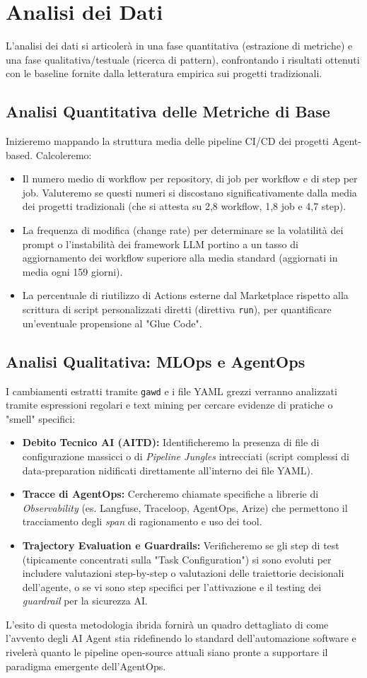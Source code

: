 \documentclass[a4paper,11pt]{article}
\begin{document}
\section{Analisi dei Dati}
L'analisi dei dati si articolerà in una fase quantitativa (estrazione di metriche) e una fase qualitativa/testuale (ricerca di pattern), confrontando i risultati ottenuti con le baseline fornite dalla letteratura empirica sui progetti tradizionali.

\subsection{Analisi Quantitativa delle Metriche di Base}
Inizieremo mappando la struttura media delle pipeline CI/CD dei progetti Agent-based. Calcoleremo:
\begin{itemize}
    \item Il numero medio di workflow per repository, di job per workflow e di step per job. Valuteremo se questi numeri si discostano significativamente dalla media dei progetti tradizionali (che si attesta su 2,8 workflow, 1,8 job e 4,7 step).
    \item La frequenza di modifica (change rate) per determinare se la volatilità dei prompt o l'instabilità dei framework LLM portino a un tasso di aggiornamento dei workflow superiore alla media standard (aggiornati in media ogni 159 giorni).
    \item La percentuale di riutilizzo di Actions esterne dal Marketplace rispetto alla scrittura di script personalizzati diretti (direttiva \texttt{run}), per quantificare un'eventuale propensione al "Glue Code".
\end{itemize}

\subsection{Analisi Qualitativa: MLOps e AgentOps}
I cambiamenti estratti tramite \texttt{gawd} e i file YAML grezzi verranno analizzati tramite espressioni regolari e text mining per cercare evidenze di pratiche o "smell" specifici:
\begin{itemize}
    \item \textbf{Debito Tecnico AI (AITD):} Identificheremo la presenza di file di configurazione massicci o di \textit{Pipeline Jungles} intrecciati (script complessi di data-preparation nidificati direttamente all'interno dei file YAML).
    \item \textbf{Tracce di AgentOps:} Cercheremo chiamate specifiche a librerie di \textit{Observability} (es. Langfuse, Traceloop, AgentOps, Arize) che permettono il tracciamento degli \textit{span} di ragionamento e uso dei tool.
    \item \textbf{Trajectory Evaluation e Guardrails:} Verificheremo se gli step di test (tipicamente concentrati sulla "Task Configuration") si sono evoluti per includere valutazioni step-by-step o valutazioni delle traiettorie decisionali dell'agente, o se vi sono step specifici per l'attivazione e il testing dei \textit{guardrail} per la sicurezza AI.
\end{itemize}

L'esito di questa metodologia ibrida fornirà un quadro dettagliato di come l'avvento degli AI Agent stia ridefinendo lo standard dell'automazione software e rivelerà quanto le pipeline open-source attuali siano pronte a supportare il paradigma emergente dell'AgentOps.
\end{document}
